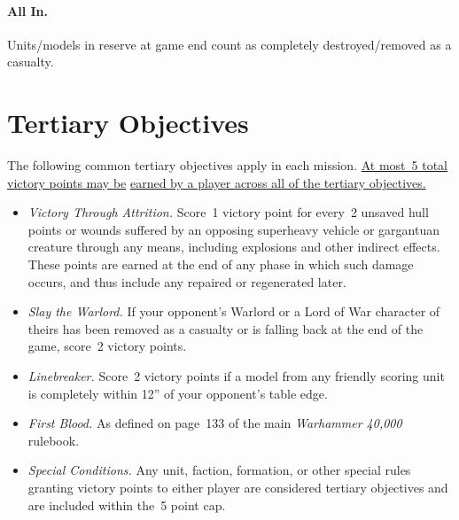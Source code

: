 \paragraph{All In.}  Units/models in reserve at game end count
as completely destroyed/removed as a casualty.

\section{Tertiary Objectives}

The following common tertiary objectives apply in each mission.
\underline{At most~5 total victory points may be}
\underline{earned by a player across all of the tertiary objectives.}

\begin{itemize}
\item \textit{Victory Through Attrition.}  Score~1 victory point for
  every~2 unsaved hull points or wounds suffered by an opposing
  superheavy vehicle or gargantuan creature through any means,
  including explosions and other indirect effects.  These points are
  earned at the end of any phase in which such damage occurs, and thus
  include any repaired or regenerated later.

\item \textit{Slay the Warlord.}  If your opponent's Warlord or a Lord
  of War character of theirs has been removed as a casualty or is
  falling back at the end of the game, score~2 victory points.

\item \textit{Linebreaker.}  Score~2 victory points if a model from
  any friendly scoring unit is completely within 12'' of your
  opponent's table edge.

\item \textit{First Blood.}  As defined on page~133 of the main
  \emph{Warhammer 40,000} rulebook.

\item \textit{Special Conditions.}  Any unit, faction, formation, or
  other special rules granting victory points to either player are
  considered tertiary objectives and are included within the~5 point
  cap.
\end{itemize}


\newcommand{\missiontitle}[1]{\clearpage\section{#1}}
\newcommand{\missionheading}[1]{\subsection{#1}}
\newcommand{\missionsubheading}[1]{\paragraph{#1}}
\setlength{\headingspacing}{0pt}


